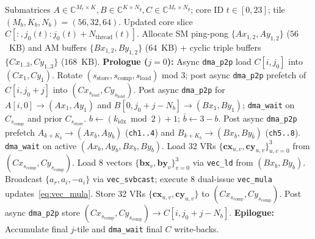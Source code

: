 \documentclass[conference]{IEEEtran}
\begin{document}
\begin{algorithm}[t]
\caption{Device-Side 14-Channel Tri-Buffered DSP Kernel}
\label{alg:device_kernel}
\footnotesize
\begin{algorithmic}[1]
\REQUIRE Submatrices $A \in \mathbb{C}^{M_r \times K}, B \in \mathbb{C}^{K \times N_g}, C \in \mathbb{C}^{M_r \times N_g}$; core ID $t \in [0, 23]$; tile $(M_b, K_b, N_b) = (56, 32, 64)$.
\ENSURE Updated core slice $C[:, j_0(t) : j_0(t)+N_{\mathrm{thread}}(t)]$.
\STATE Allocate SM ping-pong $\{Ax_{1,2}, Ay_{1,2}\}$ ($56$~KB) and AM buffers $\{Bx_{1,2}, By_{1,2}\}$ ($64$~KB) + cyclic triple buffers $\{Cx_{1..3}, Cy_{1..3}\}$ ($168$~KB).
    \STATE \textbf{Prologue ($j=0$):} Async \texttt{dma\_p2p} load $C[i, j_0]$ into $(Cx_1, Cy_1)$.
        \STATE Rotate $(s_{\mathrm{store}}, s_{\mathrm{comp}}, s_{\mathrm{load}})$ mod $3$; post async \texttt{dma\_p2p} prefetch of $C[i, j_0+j]$ into $(Cx_{s_{\mathrm{load}}}, Cy_{s_{\mathrm{load}}})$.
        \STATE Post async \texttt{dma\_p2p} for $A[i, 0] \to (Ax_1, Ay_1)$ and $B[0, j_0+j-N_b] \to (Bx_1, By_1)$; \texttt{dma\_wait} on $C_{s_{\mathrm{comp}}}$ and prior $C_{s_{\mathrm{store}}}$.
            \STATE $b \leftarrow (k_{\mathrm{idx}} \bmod 2) + 1$; $\bar{b} \leftarrow 3 - b$.
                \STATE Post async \texttt{dma\_p2p} prefetch $A_{k+K_b} \to (Ax_{\bar{b}}, Ay_{\bar{b}})$ (\texttt{ch1..4}) and $B_{k+K_b} \to (Bx_{\bar{b}}, By_{\bar{b}})$ (\texttt{ch5..8}).
            \ENDIF
            \STATE \texttt{dma\_wait} on active $(Ax_b, Ay_b, Bx_b, By_b)$.
                \STATE Load 32 VRs $\{\mathbf{cx}_{u,v}, \mathbf{cy}_{u,v}\}_{u,v=0}^{3}$ from $(Cx_{s_{\mathrm{comp}}}, Cy_{s_{\mathrm{comp}}})$.
                    \STATE Load $8$ vectors $\{\mathbf{bx}_v, \mathbf{by}_v\}_{v=0}^{3}$ via \texttt{vec\_ld} from $(Bx_b, By_b)$.
                        \STATE Broadcast $\{a_r, a_i, -a_i\}$ via \texttt{vec\_svbcast}; execute $8$ dual-issue \texttt{vec\_mula} updates~\eqref{eq:vec_mula}.
                    \ENDFOR
                \ENDFOR
                \STATE Store 32 VRs $\{\mathbf{cx}_{u,v}, \mathbf{cy}_{u,v}\}$ to $(Cx_{s_{\mathrm{comp}}}, Cy_{s_{\mathrm{comp}}})$.
            \ENDFOR
        \ENDFOR
        \STATE Post async \texttt{dma\_p2p} store $(Cx_{s_{\mathrm{comp}}}, Cy_{s_{\mathrm{comp}}}) \to C[i, j_0+j-N_b]$.
    \ENDFOR
    \STATE \textbf{Epilogue:} Accumulate final $j$-tile and \texttt{dma\_wait} final $C$ write-backs.
\ENDFOR
\end{algorithmic}
\end{algorithm}
\end{document}

